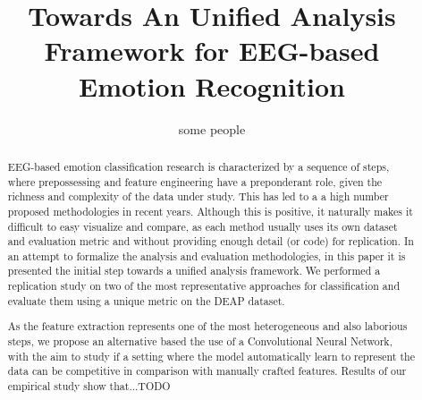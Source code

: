 \documentclass{sig-alternate}
\begin{document}
%

\title{Towards An Unified Analysis Framework for EEG-based Emotion Recognition}

%
\author{
%
%
\alignauthor
some people
}



\maketitle
\begin{abstract}
EEG-based emotion classification research is characterized 
by a sequence of steps, where  prepossessing and feature 
engineering have a preponderant role, given the richness 
and complexity of the data under study. This
has led to a a high number proposed methodologies in 
recent years. Although this is positive, it naturally makes it 
difficult to easy visualize and compare, as each method
usually uses its own dataset and evaluation metric and
without providing enough detail (or code) for replication. In 
an attempt to formalize the analysis and 
evaluation methodologies, in this paper it is presented the 
initial step towards a unified analysis framework. We performed 
a replication study  on two of the most  representative 
approaches for classification and evaluate them using a
unique metric on the DEAP dataset.

As the feature extraction represents one of the most 
heterogeneous and also laborious steps, we propose 
an alternative based  the use  of a  Convolutional 
Neural Network, with the aim to study if a setting 
where the model automatically learn to represent  
the data can be competitive in comparison with 
manually crafted features. Results of our empirical 
study show that...TODO

\end{abstract}
\end{document}
